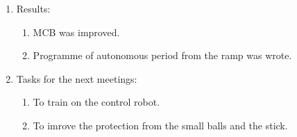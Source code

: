\begin{enumerate}
\begin{enumerate}
	\end{enumerate}
	
	\item Results:
	\begin{enumerate}
		
		\item MCB was improved.
		
		\item Programme of autonomous period from the ramp was wrote.
		
	\end{enumerate}
	
	\item Tasks for the next meetings:
	\begin{enumerate}
		
		\item To train on the control robot.
		
		\item To imrove the protection from the small balls and the stick.
			
	\end{enumerate}
\end{enumerate}
\fillpage

